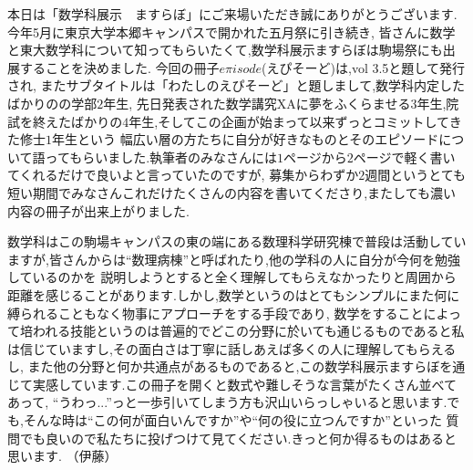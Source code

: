 本日は「数学科展示　ますらぼ」にご来場いただき誠にありがとうございます.今年5月に東京大学本郷キャンパスで開かれた五月祭に引き続き,
皆さんに数学と東大数学科について知ってもらいたくて,数学科展示ますらぼは駒場祭にも出展することを決めました.
今回の冊子$e\pi isode$(えぴそーど)は,vol 3.5と題して発行され, またサブタイトルは「わたしのえぴそーど」と題しまして,数学科内定したばかりのの学部$2$年生,
先日発表された数学講究XAに夢をふくらませる$3$年生,院試を終えたばかりの$4$年生,そしてこの企画が始まって以来ずっとコミットしてきた修士$1$年生という
幅広い層の方たちに自分が好きなものとそのエピソードについて語ってもらいました.執筆者のみなさんには$1$ページから$2$ページで軽く書いてくれるだけで良いよと言っていたのですが,
募集からわずか$2$週間というとても短い期間でみなさんこれだけたくさんの内容を書いてくださり,またしても濃い内容の冊子が出来上がりました.\par
数学科はこの駒場キャンパスの東の端にある数理科学研究棟で普段は活動していますが,皆さんからは``数理病棟''と呼ばれたり,他の学科の人に自分が今何を勉強しているのかを
説明しようとすると全く理解してもらえなかったりと周囲から距離を感じることがあります.しかし,数学というのはとてもシンプルにまた何に縛られることもなく物事にアプローチをする手段であり,
数学をすることによって培われる技能というのは普遍的でどこの分野に於いても通じるものであると私は信じていますし,その面白さは丁寧に話しあえば多くの人に理解してもらえるし,
また他の分野と何か共通点があるものであると,この数学科展示ますらぼを通じて実感しています.この冊子を開くと数式や難しそうな言葉がたくさん並べてあって,
``うわっ...''っと一歩引いてしまう方も沢山いらっしゃいると思います.でも,そんな時は``この何が面白いんですか''や``何の役に立つんですか''といった
質問でも良いので私たちに投げつけて見てください.きっと何か得るものはあると思います.
（伊藤）
